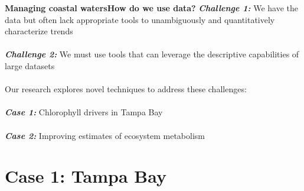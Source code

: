 \documentclass[serif]{beamer}\usepackage[]{graphicx}\usepackage[]{color}
\newcommand{\emtxt}[1]{\textbf{\textit{#1}}}
\begin{document}
\begin{frame}{\textbf{Managing coastal waters}}{\textbf{How do we use data?}}
\emtxt{Challenge 1:} We have the data but often lack appropriate tools to unambiguously and quantitatively characterize trends \\~\\
\emtxt{Challenge 2:} We must use tools that can leverage the descriptive capabilities of large datasets \\~\\
Our research explores novel techniques to address these challenges:\\~\\
\emtxt{Case 1:} Chlorophyll drivers in Tampa Bay \\~\\
\emtxt{Case 2:} Improving estimates of ecosystem metabolism 
\end{frame}

\section{Case 1: Tampa Bay}

\end{document}
